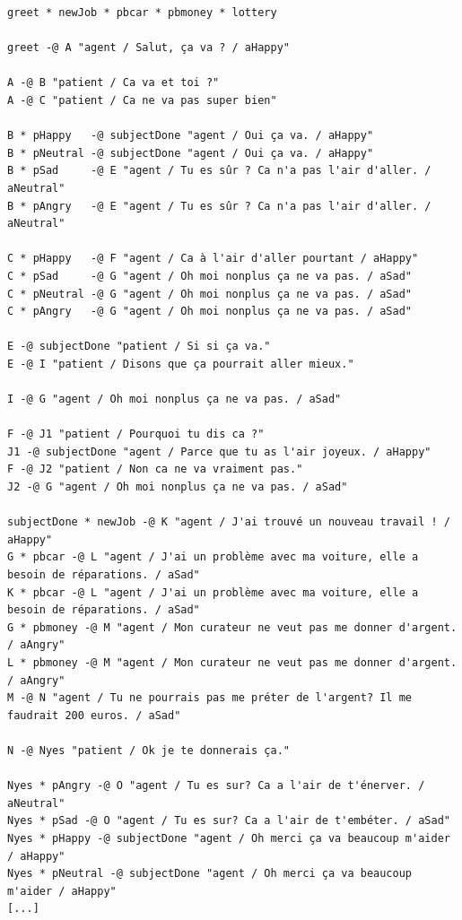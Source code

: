 \documentclass[11pt]{article}
\begin{document}
\begin{lstlisting}[basicstyle=\small]
greet * newJob * pbcar * pbmoney * lottery

greet -@ A "agent / Salut, ça va ? / aHappy"

A -@ B "patient / Ca va et toi ?"
A -@ C "patient / Ca ne va pas super bien"

B * pHappy   -@ subjectDone "agent / Oui ça va. / aHappy" 
B * pNeutral -@ subjectDone "agent / Oui ça va. / aHappy" 
B * pSad     -@ E "agent / Tu es sûr ? Ca n'a pas l'air d'aller. / aNeutral"
B * pAngry   -@ E "agent / Tu es sûr ? Ca n'a pas l'air d'aller. / aNeutral"

C * pHappy   -@ F "agent / Ca à l'air d'aller pourtant / aHappy"
C * pSad     -@ G "agent / Oh moi nonplus ça ne va pas. / aSad"
C * pNeutral -@ G "agent / Oh moi nonplus ça ne va pas. / aSad"
C * pAngry   -@ G "agent / Oh moi nonplus ça ne va pas. / aSad"

E -@ subjectDone "patient / Si si ça va." 
E -@ I "patient / Disons que ça pourrait aller mieux."

I -@ G "agent / Oh moi nonplus ça ne va pas. / aSad"

F -@ J1 "patient / Pourquoi tu dis ca ?"
J1 -@ subjectDone "agent / Parce que tu as l'air joyeux. / aHappy"
F -@ J2 "patient / Non ca ne va vraiment pas."
J2 -@ G "agent / Oh moi nonplus ça ne va pas. / aSad"

subjectDone * newJob -@ K "agent / J'ai trouvé un nouveau travail ! / aHappy"
G * pbcar -@ L "agent / J'ai un problème avec ma voiture, elle a besoin de réparations. / aSad"
K * pbcar -@ L "agent / J'ai un problème avec ma voiture, elle a besoin de réparations. / aSad"
G * pbmoney -@ M "agent / Mon curateur ne veut pas me donner d'argent. / aAngry"
L * pbmoney -@ M "agent / Mon curateur ne veut pas me donner d'argent. / aAngry"
M -@ N "agent / Tu ne pourrais pas me préter de l'argent? Il me faudrait 200 euros. / aSad"

N -@ Nyes "patient / Ok je te donnerais ça."

Nyes * pAngry -@ O "agent / Tu es sur? Ca a l'air de t'énerver. / aNeutral"
Nyes * pSad -@ O "agent / Tu es sur? Ca a l'air de t'embéter. / aSad"
Nyes * pHappy -@ subjectDone "agent / Oh merci ça va beaucoup m'aider / aHappy"
Nyes * pNeutral -@ subjectDone "agent / Oh merci ça va beaucoup m'aider / aHappy"
[...]
\end{lstlisting}
\end{document}
